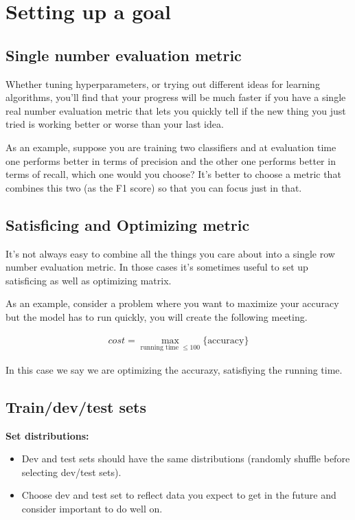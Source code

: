 \section*{Setting up a goal}
\subsection*{Single number evaluation metric}

Whether tuning hyperparameters, or trying out different ideas for learning algorithms, 
you'll find that your progress will be much faster if you have a single real number 
evaluation metric that lets you quickly tell if the new thing you just tried is working 
better or worse than your last idea.

As an example, suppose you are training two classifiers and at evaluation time one performs
better in terms of precision and the other one performs better in terms of recall, which 
one would you choose? It's better to choose a metric that combines this two (as the F1 score)
so that you can focus just in that.

\subsection*{Satisficing and Optimizing metric}

It's not always easy to combine all the things you care about into a single row number 
evaluation metric. In those cases it's sometimes useful to set up satisficing 
as well as optimizing matrix.

As an example, consider a problem where you want to maximize your accuracy but the 
model has to run quickly, you will create the following meeting.

\begin{align*}
    cost = \max_{\text{running time } \leq 100} \{\text{accuracy}\}
\end{align*}

In this case we say we are optimizing the accurazy, satisfiying the running time.

\subsection*{Train/dev/test sets}

\textbf{Set distributions:}
\begin{itemize}
    \item Dev and test sets should have the same distributions (randomly shuffle before 
    selecting dev/test sets).
    \item Choose dev and test set to reflect data you expect to get in the future and
    consider important to do well on.
\end{itemize}

